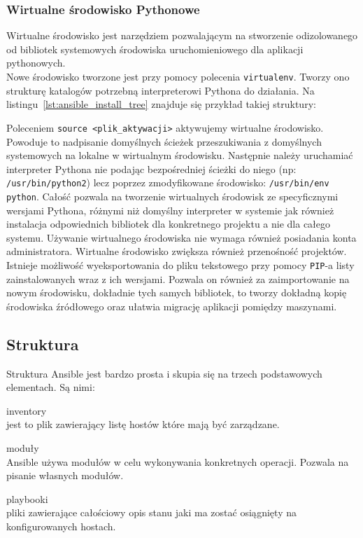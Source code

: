 \subsubsection{Wirtualne środowisko Pythonowe}
Wirtualne środowisko jest narzędziem pozwalającym na stworzenie odizolowanego od bibliotek systemowych środowiska uruchomieniowego dla aplikacji pythonowych.\\
Nowe środowisko tworzone jest przy pomocy polecenia \texttt{virtualenv}.
Tworzy ono strukturę katalogów potrzebną interpreterowi Pythona do działania. Na listingu~\ref{lst:ansible_install_tree} znajduje się przykład takiej struktury:

Poleceniem \texttt{source <plik\_aktywacji>} aktywujemy wirtualne środowisko.
Powoduje to nadpisanie domyślnych ścieżek przeszukiwania z domyślnych systemowych na lokalne w wirtualnym środowisku.
Następnie należy uruchamiać interpreter Pythona nie podając bezpośredniej ścieżki do niego (np: \texttt{/usr/bin/python2}) lecz poprzez zmodyfikowane środowisko: \texttt{/usr/bin/env python}.
Całość pozwala na tworzenie wirtualnych środowisk ze specyficznymi wersjami Pythona, różnymi niż domyślny interpreter w systemie jak również instalacja odpowiednich bibliotek dla konkretnego projektu a nie dla całego systemu.
Używanie wirtualnego środowiska nie wymaga również posiadania konta administratora.  
Wirtualne środowisko zwiększa również przenośność projektów.
Istnieje możliwość wyeksportowania do pliku tekstowego przy pomocy \texttt{PIP}-a listy zainstalowanych wraz z ich wersjami.
Pozwala on również za zaimportowanie na nowym środowisku, dokładnie tych samych bibliotek, to tworzy dokładną kopię środowiska źródłowego oraz ułatwia migrację aplikacji pomiędzy maszynami.
\subsection{Struktura}
Struktura Ansible jest bardzo prosta i skupia się na trzech podstawowych elementach. Są nimi:
\begin{description}
\item {inventory}\\jest to plik zawierający listę hostów które mają być zarządzane.
\item {moduły}\\Ansible używa modułów w celu wykonywania konkretnych operacji. Pozwala na pisanie własnych modułów.
\item {playbooki}\\pliki zawierające całościowy opis stanu jaki ma zostać osiągnięty na konfigurowanych hostach.
\end{description}
